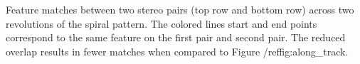 \label{fig:across_track} Feature matches between two stereo pairs (top row and bottom row) across two revolutions of the spiral pattern. The colored lines start and end points correspond to the same feature on the first pair and second pair. The reduced overlap results in fewer matches when compared to Figure /ref{fig:along_track}.
  
  